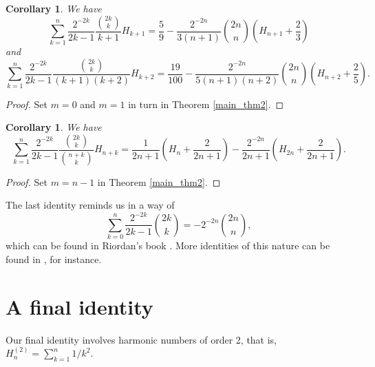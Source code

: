 \documentclass[11pt,reqno]{amsart}
\theoremstyle{plain}
\numberwithin{equation}{section}
\newtheorem{corollary}[thm]{Corollary}
\begin{document}
\begin{corollary}
We have
\begin{equation}
\sum_{k=1}^n \frac{2^{-2k}}{2k-1} \frac{\binom{2k}{k}}{k+1} H_{k+1} 
= \frac{5}{9} - \frac{2^{-2n}}{3(n+1)} \binom{2n}{n} \left ( H_{n+1} + \frac{2}{3}\right )
\end{equation}
and
\begin{equation}
\sum_{k=1}^n \frac{2^{-2k}}{2k-1} \frac{\binom{2k}{k}}{(k+1)(k+2)} H_{k+2} 
= \frac{19}{100} - \frac{2^{-2n}}{5(n+1)(n+2)} \binom{2n}{n} \left ( H_{n+2} + \frac{2}{5}\right ).
\end{equation}
\end{corollary}
\begin{proof}
Set $m=0$ and $m=1$ in turn in Theorem \ref{main_thm2}.
\end{proof}

\begin{corollary}
We have
\begin{equation}
\sum_{k=1}^n \frac{2^{-2k}}{2k-1} \frac{\binom{2k}{k}}{\binom{n+k}{k}} H_{n+k} 
= \frac{1}{2n+1}\left (H_n + \frac{2}{2n+1}\right ) - \frac{2^{-2n}}{2n+1} \left (H_{2n} + \frac{2}{2n+1}\right ).
\end{equation}
\end{corollary}
\begin{proof}
Set $m=n-1$ in Theorem \ref{main_thm2}.
\end{proof}

The last identity reminds us in a way of
\begin{equation}\label{Riordan_id}
\sum_{k=0}^n \frac{2^{-2k}}{2k-1} \binom{2k}{k} = - 2^{-2n} \binom{2n}{n},
\end{equation}
which can be found in Riordan's book \cite[p.130]{Riordan}. More identities of this nature can be found in \cite{Adegoke0}, for instance.


\section{A final identity}

Our final identity involves harmonic numbers of order 2, that is, $H_n^{(2)}=\sum_{k=1}^n 1/k^2$. 
\end{document}
